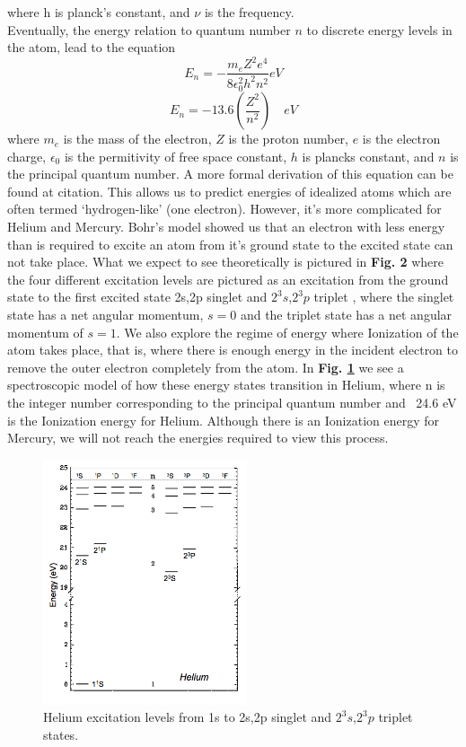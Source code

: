 \documentclass[%
 reprint,
 amsmath,amssymb,
 aps,
]{revtex4-1}
\begin{document}
where h is planck's constant, and $\nu$ is the frequency. \\
Eventually, the energy relation to quantum number $n$ to discrete energy levels in the atom, lead to the equation
\[
E_n = -\frac{m_e Z^2 e^4}{8\epsilon_0^2 h^2n^2}eV
\]
\begin{equation}\label{eq:qe}
E_n = -13.6(\frac{Z^2}{n^2})\quad eV
\end{equation}
where $m_e$ is the mass of the electron, $Z$ is the proton number, $e$ is the electron charge, $\epsilon_0$ is the permitivity of free space constant, $h$ is plancks constant, and $n$ is the principal quantum number. A more formal derivation of this equation can be found at citation\cite{esderiv}. This allows us to predict energies of idealized atoms which are often termed `hydrogen-like' (one electron). However, it's more complicated for Helium and Mercury. Bohr's model showed us that an electron with less energy than is required to excite an atom from it's ground state to the excited state can not take place. What we expect to see theoretically is pictured in \textbf{Fig. 2} where the four different excitation levels are pictured as an excitation from the ground state to the first excited state 2s,2p singlet and $2^3s$,$2^3p$ triplet \cite{hell} , where the singlet state has a net angular momentum, $s = 0$ and the triplet state has a net angular momentum of $s = 1$\cite{hell}. We also explore the regime of energy where Ionization of the atom takes place, that is, where there is enough energy in the incident electron to remove the outer electron completely from the atom. In \textbf{Fig. \ref{fig:helex}} we see a spectroscopic model of how these energy states transition in Helium, where n is the integer number corresponding to the principal quantum number and ~24.6 eV is the Ionization energy for Helium. Although there is an Ionization energy for Mercury, we will not reach the energies required to view this process.

\begin{figure}
\includegraphics[width = 6cm,keepaspectratio]{ee.png}
\caption{Helium excitation levels from 1s to 2s,2p singlet and $2^3s$,$2^3p$ triplet states.\cite{hell}}
\label{fig:helex}
\end{figure}
\end{document}

